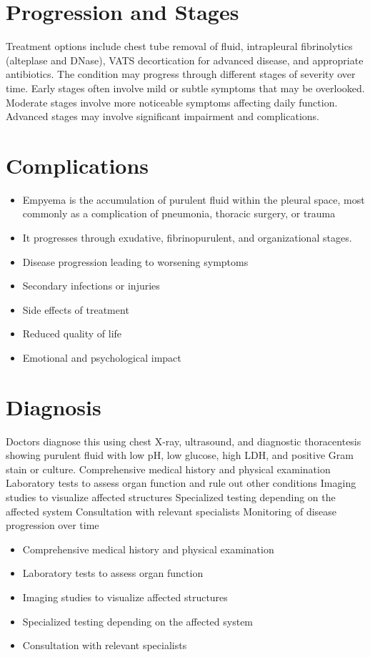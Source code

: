 \section{Progression and Stages}
Treatment options include chest tube removal of fluid, intrapleural fibrinolytics (alteplase and DNase), VATS decortication for advanced disease, and appropriate antibiotics. The condition may progress through different stages of severity over time. Early stages often involve mild or subtle symptoms that may be overlooked. Moderate stages involve more noticeable symptoms affecting daily function. Advanced stages may involve significant impairment and complications.
\section{Complications}
\begin{itemize}[noitemsep]
  \item Empyema is the accumulation of purulent fluid within the pleural space, most commonly as a complication of pneumonia, thoracic surgery, or trauma
  \item It progresses through exudative, fibrinopurulent, and organizational stages.
  \item Disease progression leading to worsening symptoms
  \item Secondary infections or injuries
  \item Side effects of treatment
  \item Reduced quality of life
  \item Emotional and psychological impact
\end{itemize}
\section{Diagnosis}
Doctors diagnose this using chest X-ray, ultrasound, and diagnostic thoracentesis showing purulent fluid with low pH, low glucose, high LDH, and positive Gram stain or culture. Comprehensive medical history and physical examination Laboratory tests to assess organ function and rule out other conditions Imaging studies to visualize affected structures Specialized testing depending on the affected system Consultation with relevant specialists Monitoring of disease progression over time

\begin{itemize}[noitemsep]
  \item Comprehensive medical history and physical examination
  \item Laboratory tests to assess organ function
  \item Imaging studies to visualize affected structures
  \item Specialized testing depending on the affected system
  \item Consultation with relevant specialists
\end{itemize}
